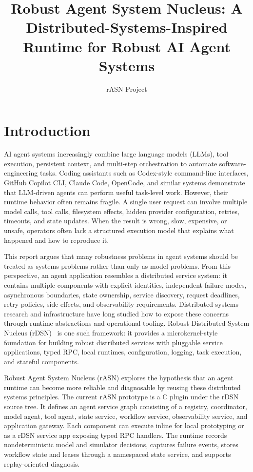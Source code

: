 \documentclass[manuscript,screen,review]{acmart}
\title{Robust Agent System Nucleus: A Distributed-Systems-Inspired Runtime for Robust AI Agent Systems}
\author{rASN Project}
\affiliation{%
  \institution{Robust Agent System Nucleus Prototype}
  \city{Beijing}
  \country{China}}
\newcommand{\rasn}{rASN\xspace}
\newcommand{\rdsn}{rDSN\xspace}
\newcommand{\cpp}{C\nolinebreak\hspace{-.05em}\raisebox{.4ex}{\tiny\bf ++}\xspace}
\begin{document}
\maketitle

\section{Introduction}

AI agent systems increasingly combine large language models (LLMs), tool
execution, persistent context, and multi-step orchestration to automate
software-engineering tasks. Coding assistants such as Codex-style command-line
interfaces, GitHub Copilot CLI, Claude Code, OpenCode, and similar systems
demonstrate that LLM-driven agents can perform useful task-level work. However,
their runtime behavior often remains fragile. A single user request can involve
multiple model calls, tool calls, filesystem effects, hidden provider
configuration, retries, timeouts, and state updates. When the result is wrong,
slow, expensive, or unsafe, operators often lack a structured execution model
that explains what happened and how to reproduce it.

This report argues that many robustness problems in agent systems should be
treated as systems problems rather than only as model problems. From this
perspective, an agent application resembles a distributed service system: it
contains multiple components with explicit identities, independent failure
modes, asynchronous boundaries, state ownership, service discovery, request
deadlines, retry policies, side effects, and observability requirements.
Distributed systems research and infrastructure have long studied how to expose
these concerns through runtime abstractions and operational tooling. Robust
Distributed System Nucleus (\rdsn)~\cite{rdsn} is one such framework: it provides a
microkernel-style foundation for building robust distributed services with
pluggable service applications, typed RPC, local runtimes, configuration,
logging, task execution, and stateful components.

Robust Agent System Nucleus (\rasn) explores the hypothesis that an agent
runtime can become more reliable and diagnosable by reusing these distributed
systems principles. The current \rasn prototype is a \cpp plugin under the
\rdsn source tree. It defines an agent service graph consisting of a registry,
coordinator, model agent, tool agent, state service, workflow service,
observability service, and application gateway. Each component can execute
inline for local prototyping or as a \rdsn service app exposing typed RPC
handlers. The runtime records nondeterministic model and simulator decisions,
captures failure events, stores workflow state and leases through a namespaced
state service, and supports replay-oriented diagnosis.
\end{document}
